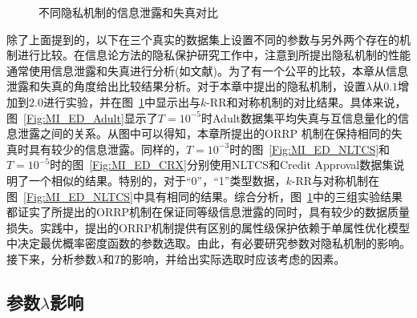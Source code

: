 \begin{figure}[htbp]
	\centering
	\centering
	\caption{不同隐私机制的信息泄露和失真对比}
	\label{Fig:5}
\end{figure}

除了上面提到的，以下在三个真实的数据集上设置不同的参数与另外两个存在的机制进行比较。在信息论方法的隐私保护研究工作中，注意到所提出隐私机制的性能通常使用信息泄露和失真进行分析(如文献)。为了有一个公平的比较，本章从信息泄露和失真的角度给出比较结果分析。对于本章中提出的隐私机制，设置$\lambda$从$0.1$增加到$2.0$进行实验，并在图~\ref{Fig:5}中显示出与$k$-RR和对称机制的对比结果。具体来说，图~\ref{Fig:MI_ED_Adult}显示了$T=10^{-5}$时Adult数据集平均失真与互信息量化的信息泄露之间的关系。从图中可以得知，本章所提出的ORRP 机制在保持相同的失真时具有较少的信息泄露。同样的，$T=10^{-3}$时的图~\ref{Fig:MI_ED_NLTCS}和$T=10^{-5}$时的图~\ref{Fig:MI_ED_CRX}分别使用NLTCS和Credit Approval数据集说明了一个相似的结果。特别的，对于``0''，``1''类型数据，$k$-RR与对称机制在图~\ref{Fig:MI_ED_NLTCS}中具有相同的结果。综合分析，图~\ref{Fig:5}中的三组实验结果都证实了所提出的ORRP机制在保证同等级信息泄露的同时，具有较少的数据质量损失。实践中，提出的ORRP机制提供有区别的属性级保护依赖于单属性优化模型中决定最优概率密度函数的参数选取。由此，有必要研究参数对隐私机制的影响。接下来，分析参数$\lambda$和$T$的影响，并给出实际选取时应该考虑的因素。


\subsection{参数$\lambda$影响}\label{sec:Impactlambda}


